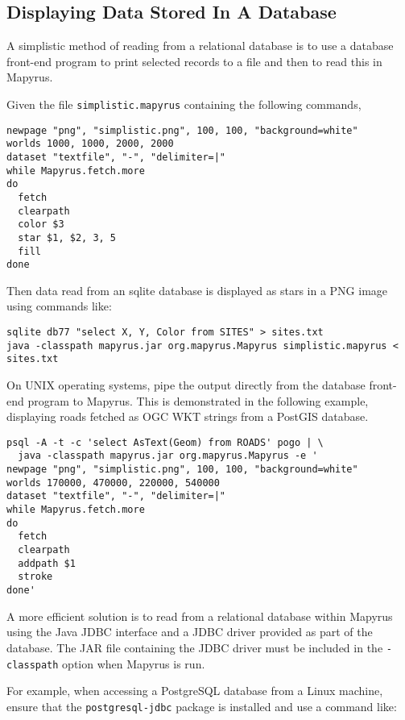 \subsection{Displaying Data Stored In A Database}

A simplistic method of reading from a relational database is to use a database
front-end program to print selected records to a file and then to read this in
Mapyrus.

Given the file \texttt{simplistic.mapyrus} containing the following
commands,

\begin{verbatim}
newpage "png", "simplistic.png", 100, 100, "background=white"
worlds 1000, 1000, 2000, 2000
dataset "textfile", "-", "delimiter=|"
while Mapyrus.fetch.more
do
  fetch
  clearpath
  color $3
  star $1, $2, 3, 5
  fill
done
\end{verbatim}

Then data read from an sqlite database is displayed as stars in a
PNG image using commands like:

\begin{verbatim}
sqlite db77 "select X, Y, Color from SITES" > sites.txt
java -classpath mapyrus.jar org.mapyrus.Mapyrus simplistic.mapyrus < sites.txt
\end{verbatim}

On UNIX operating systems, pipe the output directly from the database
front-end program to Mapyrus.  This is demonstrated in the following
example, displaying roads fetched as OGC WKT strings from a PostGIS database.

\begin{verbatim}
psql -A -t -c 'select AsText(Geom) from ROADS' pogo | \
  java -classpath mapyrus.jar org.mapyrus.Mapyrus -e '
newpage "png", "simplistic.png", 100, 100, "background=white"
worlds 170000, 470000, 220000, 540000
dataset "textfile", "-", "delimiter=|"
while Mapyrus.fetch.more
do
  fetch
  clearpath
  addpath $1
  stroke
done'
\end{verbatim}

A more efficient solution is to read from a relational database within Mapyrus
using the Java JDBC interface and a JDBC driver provided
as part of the database.  The JAR file containing the
JDBC driver must be included in the \texttt{-classpath} option
when Mapyrus is run.

For example, when accessing a PostgreSQL database from a Linux
machine, ensure that the \texttt{postgresql-jdbc} package is
installed and use a command like:

